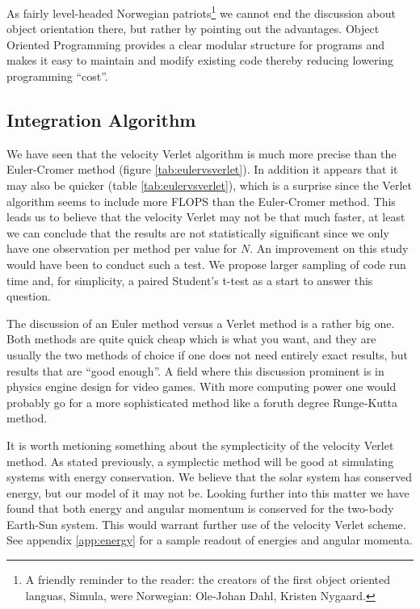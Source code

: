 \documentclass[10pt,a4paper]{amsart}
\begin{document}
As fairly level-headed Norwegian patriots\footnote{A friendly reminder to the reader: the creators of the first object oriented languas, Simula, were Norwegian: Ole-Johan Dahl, Kristen Nygaard.} we cannot end the discussion about object orientation there, but rather by pointing out the advantages. Object Oriented Programming provides a clear modular structure for programs and makes it easy to maintain and modify existing code thereby reducing lowering programming ``cost''.

\subsection{Integration Algorithm}

We have seen that the velocity Verlet algorithm is much more precise than the Euler-Cromer method (figure \ref{tab:eulervsverlet}). In addition it appears that it may also be quicker (table \ref{tab:eulervsverlet}), which is a surprise since the Verlet algorithm seems to include more FLOPS than the Euler-Cromer method. This leads us to believe that the velocity Verlet may not be that much faster, at least we can conclude that the results are not statistically significant since we only have one observation per method per value for $N$. An improvement on this study would have been to conduct such a test. We propose larger sampling of code run time and, for simplicity, a paired Student's t-test as a start to answer this question\cite{student}.

The discussion of an Euler method versus a Verlet method is a rather big one. Both methods are quite quick cheap which is what you want, and they are usually the two methods of choice if one does not need entirely exact results, but results that are ``good enough''. A field where this discussion prominent is in physics engine design for video games. With more computing power one would probably go for a more sophisticated method like a foruth degree Runge-Kutta method\cite{physicsengine}.

It is worth metioning something about the symplecticity of the velocity Verlet method. As stated previously, a symplectic method will be good at simulating systems with energy conservation. We believe that the solar system has conserved energy, but our model of it may not be. Looking further into this matter we have found that both energy and angular momentum is conserved for the two-body Earth-Sun system. This would warrant further use of the velocity Verlet scheme. See appendix \ref{app:energy} for a sample readout of energies and angular momenta.
\end{document}
